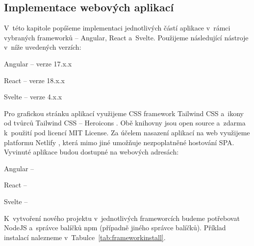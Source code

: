 \subsection{Implementace webových aplikací}

V~této kapitole popíšeme implementaci jednotlivých částí aplikace v~rámci vybraných frameworků -- Angular, React a~Svelte. Použijeme následující nástroje v~níže uvedených verzích:

\begin{citemize}
	\item Angular -- verze 17.x.x
	\item React -- verze 18.x.x
	\item Svelte -- verze 4.x.x
\end{citemize}

Pro grafickou stránku aplikací využijeme CSS framework Tailwind CSS \cite{tailwindcssframework} a~ikony od tvůrců Tailwind CSS -- Heroicons \cite{heroiconslib}. 
Obě knihovny jsou open source a~zdarma k~použití pod licencí MIT License. 
Za účelem nasazení aplikací na web využijeme platformu Netlify \cite{netlifyplatform}, která mimo jiné umožňuje nezpoplatněné hostování SPA. 
Vyvinuté aplikace budou dostupné na webových adresách:

\begin{citemize}
	\item Angular -- 
	\item React -- 
	\item Svelte -- 
\end{citemize}

K~vytvoření nového projektu v~jednotlivých frameworcích budeme potřebovat NodeJS a~správce balíčků npm (případně jiného správce balíčků). 
Příklad instalací nalezneme v~Tabulce~\ref{tab:frameworkinstall}.

